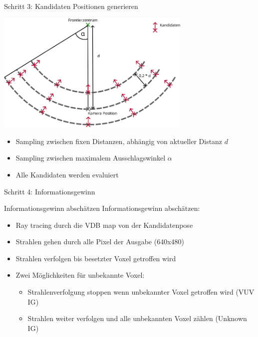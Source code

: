 \documentclass{beamer}
\begin{document}
\begin{frame}{Schritt 3: Kandidaten Positionen generieren}
	\begin{block}{}

		\begin{center}
			\includegraphics[width=0.7\textwidth]{Graphics/view_point_gen_v2.png}
		\end{center}
		\begin{itemize}
			\item Sampling zwischen fixen Distanzen, abhängig von aktueller Distanz $d$
			\item Sampling zwischen maximalem Ausschlagswinkel $\alpha$
			\item Alle Kandidaten werden evaluiert
		\end{itemize}
	\end{block}

\end{frame}

\begin{frame}{Schritt 4: Informationsgewinn}
	\begin{block}{Informationsgewinn abschätzen}
		Informationsgewinn abschätzen:
		\begin{itemize}
			\item Ray tracing durch die VDB map von der Kandidatenpose
			\item Strahlen gehen durch alle Pixel der Ausgabe (640x480)
			\item Strahlen verfolgen bis besetzter Voxel getroffen wird
			\item Zwei Möglichkeiten für unbekannte Voxel: \begin{itemize}
				      \item Strahlenverfolgung stoppen wenn unbekannter Voxel getroffen wird (VUV IG)
				      \item Strahlen weiter verfolgen und alle unbekannten Voxel zählen (Unknown IG)
			      \end{itemize}
		\end{itemize}

	\end{block}

\end{frame}
\end{document}
